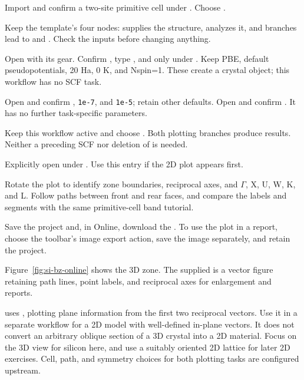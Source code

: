 

\begin{steps}
\item Import  and confirm a two-site primitive cell under . Choose .
\item Keep the template's four nodes:  supplies the structure,  analyzes it, and branches lead to  and . Check the inputs before changing anything.
\item Open  with its gear. Confirm , type , and only  under . Keep PBE, default pseudopotentials, 20 Ha, 0 K, and Nspin=1. These create a crystal object; this workflow has no SCF task.
\item Open  and confirm ,  \texttt{1e-7}, and  \texttt{1e-5}; retain other defaults. Open  and confirm . It has no further task-specific parameters.
\item Keep this workflow active and choose . Both plotting branches produce results. Neither a preceding SCF nor deletion of  is needed.
\item Explicitly open  under . Use this entry if the 2D plot appears first.
\item Rotate the plot to identify zone boundaries, reciprocal axes, and $\Gamma$, X, U, W, K, and L. Follow paths between front and rear faces, and compare the labels and segments with the same primitive-cell band tutorial.
\item Save the project and, in Online, download the . To use the plot in a report, choose the toolbar's image export action, save the image separately, and retain the project.
\end{steps}



Figure~\ref{fig:si-bz-online} shows the 3D zone. The supplied  is a vector figure retaining path lines, point labels, and reciprocal axes for enlargement and reports.

 uses , plotting plane information from the first two reciprocal vectors. Use it in a separate workflow for a 2D model with well-defined in-plane vectors. It does not convert an arbitrary oblique section of a 3D crystal into a 2D material. Focus on the 3D view for silicon here, and use a suitably oriented 2D lattice for later 2D exercises. Cell, path, and symmetry choices for both plotting tasks are configured upstream.

